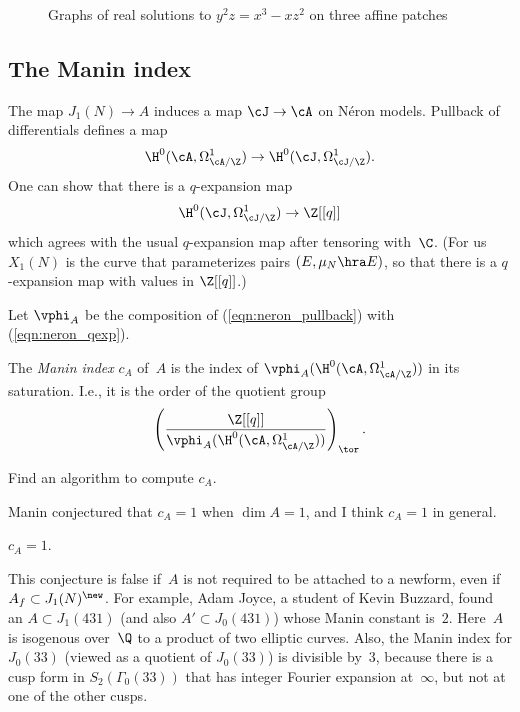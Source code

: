 \documentclass{report}
\begin{document}
\begin{figure}
\begin{center}
\end{center}
\caption{Graphs of real solutions to $y^2z = x^3 - xz^2$ on three affine patches}
\end{figure}


\subsection{The Manin index}
The map $J_1(N)\to A$ induces a map $\cJ\to\cA$ on N\'eron models.
Pullback of differentials defines a map
\begin{equation}\label{eqn:neron_pullback}
  \H^0(\cA,\Omega_{\cA/\Z}^1) \to \H^0(\cJ,\Omega_{\cJ/\Z}^1).
\end{equation}
One can show that there is a
$q$-expansion map
\begin{equation}\label{eqn:neron_qexp}
\H^0(\cJ,\Omega_{\cJ/\Z}^1)\to \Z[[q]]
\end{equation}
which agrees with the usual $q$-expansion map after tensoring
with~$\C$.  (For us $X_1(N)$ is the curve that parameterizes pairs
$(E,\mu_N\hra E)$, so that there is a $q$-expansion map with values in
$\Z[[q]]$.)


Let $\vphi_A$ be the composition of (\ref{eqn:neron_pullback})
with (\ref{eqn:neron_qexp}).
\begin{definition}
The {\em Manin index} $c_A$ of~$A$ is the index of
$\vphi_A(\H^0(\cA,\Omega_{\cA/\Z}^1))$
in its saturation.  I.e., it is the order of the quotient group
$$
 \left( \frac{\Z[[q]]}{\vphi_A(\H^0(\cA,\Omega_{\cA/\Z}^1))} \right)_{\tor}.
$$
\end{definition}

\begin{openproblem}
Find an algorithm to compute $c_A$.
\end{openproblem}
Manin conjectured that $c_A=1$ when $\dim A=1$, and I think $c_A=1$ in general.
\begin{conjecture}
$c_A=1$.
\end{conjecture}
This conjecture is false if~$A$ is not required to be attached to a
newform, even if $A_f\subset J_1(N)^{\new}$.  For example, Adam Joyce,
a student of Kevin Buzzard, found an $A\subset J_1(431)$ (and also
$A'\subset J_0(431)$) whose Manin constant is~$2$.  Here~$A$ is
isogenous over~$\Q$ to a product of two elliptic curves.    Also, the Manin index for $J_0(33)$ (viewed as a
quotient of $J_0(33)$) is divisible by~$3$, because there is a cusp
form in $S_2(\Gamma_0(33))$ that has integer Fourier expansion
at~$\infty$, but not at one of the other cusps.
\end{document}
